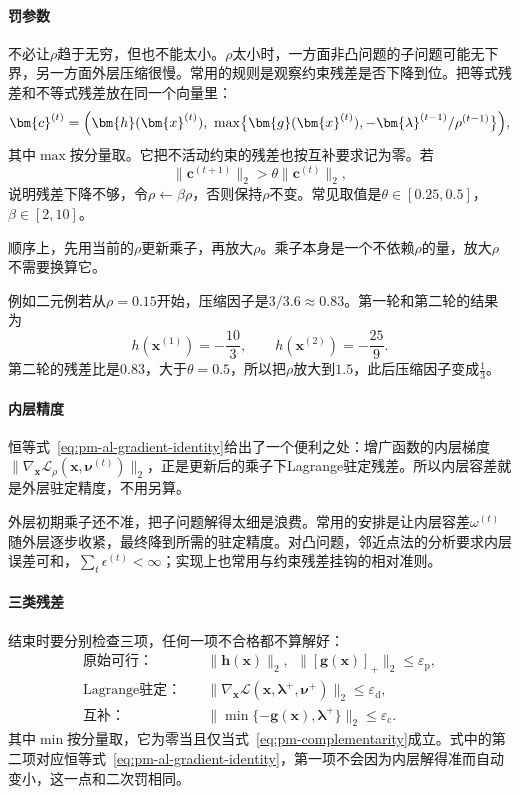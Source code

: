 \paragraph{罚参数}
不必让$\rho$趋于无穷，但也不能太小。$\rho$太小时，一方面非凸问题的子问题可能无下界，另一方面外层压缩很慢。常用的规则是观察约束残差是否下降到位。把等式残差和不等式残差放在同一个向量里：
\begin{equation}
 \bm{c}^{(t)}=\Bigl(\bm{h}(\bm{x}^{(t)}),\ \max\bigl\{\bm{g}(\bm{x}^{(t)}),-\bm{\lambda}^{(t-1)}/\rho^{(t-1)}\bigr\}\Bigr),
 \label{eq:pm-alm-residual-vector}
\end{equation}
其中$\max$按分量取。它把不活动约束的残差也按互补要求记为零。若
\begin{equation}
 \lVert\bm{c}^{(t+1)}\rVert_2>\theta\lVert\bm{c}^{(t)}\rVert_2,
 \label{eq:pm-alm-rho-test}
\end{equation}
说明残差下降不够，令$\rho\leftarrow\beta\rho$，否则保持$\rho$不变。常见取值是$\theta\in[0.25,0.5]$，$\beta\in[2,10]$。

顺序上，先用当前的$\rho$更新乘子，再放大$\rho$。乘子本身是一个不依赖$\rho$的量，放大$\rho$不需要换算它。

例如二元例若从$\rho=0.15$开始，压缩因子是$3/3.6\approx0.83$。第一轮和第二轮的结果为
\[
 h(\bm{x}^{(1)})=-\frac{10}{3},\qquad h(\bm{x}^{(2)})=-\frac{25}{9}.
\]
第二轮的残差比是$0.83$，大于$\theta=0.5$，所以把$\rho$放大到$1.5$，此后压缩因子变成$\tfrac13$。

\paragraph{内层精度}
恒等式~\eqref{eq:pm-al-gradient-identity}给出了一个便利之处：增广函数的内层梯度$\lVert\nabla_{\bm{x}}\mathcal{L}_\rho(\bm{x},\bm{\nu}^{(t)})\rVert_2$，正是更新后的乘子下Lagrange驻定残差。所以内层容差就是外层驻定精度，不用另算。

外层初期乘子还不准，把子问题解得太细是浪费。常用的安排是让内层容差$\omega^{(t)}$随外层逐步收紧，最终降到所需的驻定精度。对凸问题，邻近点法的分析要求内层误差可和，$\sum_t\epsilon^{(t)}<\infty$；实现上也常用与约束残差挂钩的相对准则。

\paragraph{三类残差}
结束时要分别检查三项，任何一项不合格都不算解好：
\begin{equation}
 \begin{aligned}
 \text{原始可行：}\quad&\lVert\bm{h}(\bm{x})\rVert_2,\ \ \lVert[\bm{g}(\bm{x})]_+\rVert_2\leq\varepsilon_{\mathrm{p}},\\
 \text{Lagrange驻定：}\quad&\lVert\nabla_{\bm{x}}\mathcal{L}(\bm{x},\bm{\lambda}^{+},\bm{\nu}^{+})\rVert_2\leq\varepsilon_{\mathrm{d}},\\
 \text{互补：}\quad&\lVert\min\{-\bm{g}(\bm{x}),\bm{\lambda}^{+}\}\rVert_2\leq\varepsilon_{\mathrm{c}}.
 \end{aligned}
 \label{eq:pm-alm-stopping}
\end{equation}
其中$\min$按分量取，它为零当且仅当式~\eqref{eq:pm-complementarity}成立。式中的第二项对应恒等式~\eqref{eq:pm-al-gradient-identity}，第一项不会因为内层解得准而自动变小，这一点和二次罚相同。

